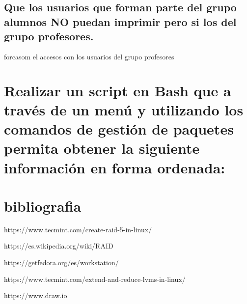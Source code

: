 \documentclass[preprint,11pt]{elsarticle}
\begin{document}
\subsection{Que los usuarios que forman parte del grupo alumnos NO puedan imprimir pero si los del grupo profesores.}
forcasom el accesos con los usuarios del grupo profesores 


\clearpage
\section{Realizar un script en Bash que a través de un menú y utilizando los comandos de gestión de paquetes permita obtener la siguiente información en forma ordenada:}



\clearpage
\section{bibliografia}
https://www.tecmint.com/create-raid-5-in-linux/ \smallskip

https://es.wikipedia.org/wiki/RAID\smallskip

https://getfedora.org/es/workstation/\smallskip

https://www.tecmint.com/extend-and-reduce-lvms-in-linux/\smallskip

https://www.draw.io\smallskip
\end{document}
